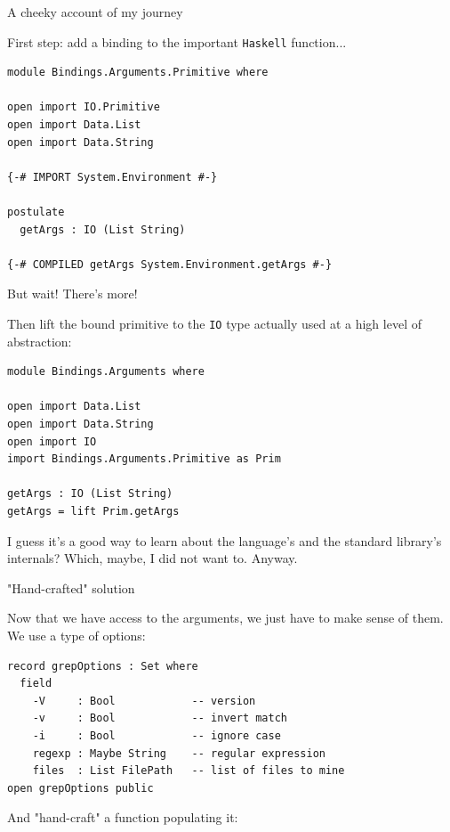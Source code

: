 \documentclass[dvipsnames]{beamer}
\begin{document}
\begin{frame}[fragile]{A cheeky account of my journey}

  First step: add a binding to the important \texttt{Haskell}
  function...

\begin{verbatim}
module Bindings.Arguments.Primitive where

open import IO.Primitive
open import Data.List
open import Data.String

{-# IMPORT System.Environment #-}

postulate
  getArgs : IO (List String)

{-# COMPILED getArgs System.Environment.getArgs #-}

\end{verbatim}
\end{frame}

\begin{frame}[fragile]{But wait! There's more!}

  Then lift the bound primitive to the \texttt{IO} type actually used
  at a high level of abstraction:

\begin{verbatim}
module Bindings.Arguments where

open import Data.List
open import Data.String
open import IO
import Bindings.Arguments.Primitive as Prim

getArgs : IO (List String)
getArgs = lift Prim.getArgs
\end{verbatim}

  I guess it's a good way to learn about the language's and the
  standard library's internals? Which, maybe, I did not want to.
  Anyway.
\end{frame}

\begin{frame}[fragile]{"Hand-crafted" solution}

Now that we have access to the arguments, we just have to make sense
of them. We use a type of options:

\begin{verbatim}
record grepOptions : Set where
  field
    -V     : Bool            -- version
    -v     : Bool            -- invert match
    -i     : Bool            -- ignore case
    regexp : Maybe String    -- regular expression
    files  : List FilePath   -- list of files to mine
open grepOptions public
\end{verbatim}

And "hand-craft" a function populating it:
\end{frame}
\end{document}
